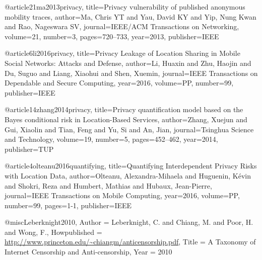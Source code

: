 @article{21ma2013privacy,
  title={Privacy vulnerability of published anonymous mobility traces},
  author={Ma, Chris YT and Yau, David KY and Yip, Nung Kwan and Rao, Nageswara SV},
  journal={IEEE/ACM Transactions on Networking},
  volume={21},
  number={3},
  pages={720--733},
  year={2013},
  publisher={IEEE}
}

@article{6li2016privacy,
  title={Privacy Leakage of Location Sharing in Mobile Social Networks: Attacks and Defense},
  author={Li, Huaxin and Zhu, Haojin and Du, Suguo and Liang, Xiaohui and Shen, Xuemin},
  journal={IEEE Transactions on Dependable and Secure Computing},
  year={2016},
  volume={PP},
  number={99},
  publisher={IEEE}
}


@article{14zhang2014privacy,
  title={Privacy quantification model based on the Bayes conditional risk in Location-Based Services},
  author={Zhang, Xuejun and Gui, Xiaolin and Tian, Feng and Yu, Si and An, Jian},
  journal={Tsinghua Science and Technology},
  volume={19},
  number={5},
  pages={452--462},
  year={2014},
  publisher={TUP}
}

@article{4olteanu2016quantifying,
  title={Quantifying Interdependent Privacy Risks with Location Data},
  author={Olteanu, Alexandra-Mihaela and Huguenin, K{\'e}vin and Shokri, Reza and Humbert, Mathias and Hubaux, Jean-Pierre},
  journal={IEEE Transactions on Mobile Computing},
  year={2016},
  volume={PP},
  number={99},
  pages={1-1},
  publisher={IEEE}
}















@misc{Leberknight2010,
	Author = {Leberknight, C. and Chiang, M. and Poor, H. and Wong, F.},
	Howpublished = {\url{http://www.princeton.edu/~chiangm/anticensorship.pdf}},
	Title = {{A Taxonomy of Internet Censorship and Anti-censorship}},
	Year = {2010}}

